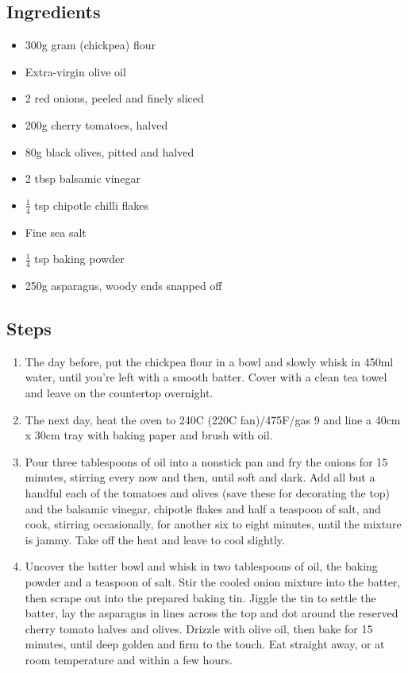 \documentclass{book}
\begin{document}
\subsection*{Ingredients}
\begin{itemize}
\item 300g gram (chickpea) flour
\item Extra-virgin olive oil
\item 2 red onions, peeled and finely sliced
\item 200g cherry tomatoes, halved
\item 80g black olives, pitted and halved
\item 2 tbsp balsamic vinegar
\item $\frac{1}{4}$ tsp chipotle chilli flakes
\item Fine sea salt
\item $\frac{1}{4}$ tsp baking powder
\item 250g asparagus, woody ends snapped off
\end{itemize}

\subsection*{Steps}
\begin{enumerate}
\item The day before, put the chickpea flour in a bowl and slowly whisk in 450ml water, until you’re left with a smooth batter. Cover with a clean tea towel and leave on the countertop overnight.
\item The next day, heat the oven to 240C (220C fan)/475F/gas 9 and line a 40cm x 30cm tray with baking paper and brush with oil.
\item Pour three tablespoons of oil into a nonstick pan and fry the onions for 15 minutes, stirring every now and then, until soft and dark. Add all but a handful each of the tomatoes and olives (save these for decorating the top) and the balsamic vinegar, chipotle flakes and half a teaspoon of salt, and cook, stirring occasionally, for another six to eight minutes, until the mixture is jammy. Take off the heat and leave to cool slightly.
\item Uncover the batter bowl and whisk in two tablespoons of oil, the baking powder and a teaspoon of salt. Stir the cooled onion mixture into the batter, then scrape out into the prepared baking tin. Jiggle the tin to settle the batter, lay the asparagus in lines across the top and dot around the reserved cherry tomato halves and olives. Drizzle with olive oil, then bake for 15 minutes, until deep golden and firm to the touch. Eat straight away, or at room temperature and within a few hours.
\end{enumerate}
\newpage
\end{document}
